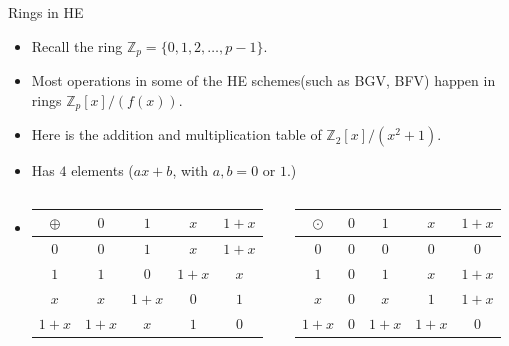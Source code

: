 \documentclass[ %
usenames,dvipsnames,
aspectratio=169,11pt]{beamer}
\newenvironment{stepitemize}{\begin{itemize}[<+->]}{\end{itemize} }
\newcommand{\Z}{\mathbb{Z}}
\begin{document}
\begin{frame}{Rings in HE}
\begin{stepitemize}
\item Recall the ring $\Z_p=\{0,1,2, \dots, p-1\}$.
    \item Most operations in some of the HE schemes(such as BGV, BFV) happen in rings $\Z_p[x]/(f(x))$.
    \item Here is the addition and multiplication table of $\Z_2[x]/(x^2+1)$.
    \item Has $4$ elements ($ax+b$, with $a,b=0$ or $1$.)

    \bigskip
    \item []
    \bigskip

    \begin{columns}
        \begin{column}{0.5\textwidth}
     \begin{table}
            \begin{tabular}{ c| c | c |c|c}
$\oplus$  & $0$ & $1$ & $x$ & $1+x$\\
\hline
$0$ & $0$ & $1$ & $x$ & $1+x$ \\
\hline
$1$ & $1$ & $0$ & $1+x$ & $x$ \\
\hline
$x$& $x$ & $1+x$ &$0$ & $1$\\
\hline
$1+x$& $1+x$ & $x$ &$1$ & $0$
\end{tabular}
\end{table}
    \end{column}

        \begin{column}{0.4\textwidth}
    \begin{table}
            \begin{tabular}{ c| c | c |c|c}
$\odot$  & $0$ & $1$ & $x$ & $1+x$\\
\hline
$0$ & $0$ & $0$ & $0$ & $0$ \\
\hline
$1$ & $0$ & $1$ & $x$ & $1+x$ \\
\hline
$x$& $0$ & $x$ &$1$ & $1+x$\\
\hline
$1+x$& $0$ & $1+x$ &$1+x$ & $0$
\end{tabular}
\end{table}
    \end{column}
\end{columns}

\end{stepitemize}
\end{frame}
\end{document}
